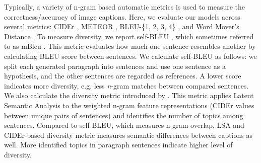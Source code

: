 \documentclass[11pt,a4paper]{article}
\begin{document}
Typically, a variety of n-gram based automatic metrics is used to measure the correctness/accuracy of image captions.
Here, we evaluate our models across several metrics: CIDEr \cite{vedantam2014cider}, METEOR \cite{meteor14}, BLEU-\{1, 2, 3, 4\} \cite{bleu}, and Word Mover's Distance \cite{Kusner2015FromWE,kilickaya2017}.
To measure diversity, we report self-BLEU \cite{Zhu2018selfbleu}, which sometimes referred to as mBleu \cite{Shetty2017}.
This metric evaluates how much one sentence resembles another by calculating BLEU score between sentences.
We calculate self-BLEU as follows: we split each generated paragraph into sentences and use one sentence as a hypothesis, and the other sentences are regarded as references.
A lower score indicates more diversity, e.g. less \textit{n}-gram matches between compared sentences.
We also calculate the diversity metric introduced by .
This metric applies Latent Semantic Analysis \cite{deerwester90indexing} to the weighted n-gram feature representations (CIDEr values between unique pairs of sentences) and identifies the number of topics among sentences.
Compared to self-BLEU, which measures n-gram overlap, LSA and CIDEr-based diversity metric measures semantic differences between captions as well.
More identified topics in paragraph sentences indicate higher level of diversity.

\end{document}
